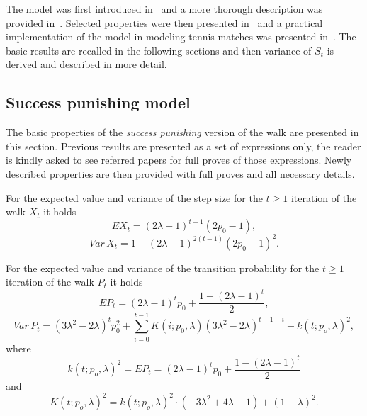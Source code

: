 \documentclass[runningheads]{CMSIM}
\begin{document}
    The model was first introduced in~\cite{ja2017ddny} and a more thorough
    description was provided in~\cite{ja2019teze}.
    Selected properties
    were then presented in~\cite{ja2019apmat} and a practical implementation
    of the model in modeling tennis matches was presented in~\cite{ja2019mathsport_proc}.
    The basic results are recalled in the following sections and then
    variance of $S_{t}$ is derived and described in more detail.

    \subsection{Success punishing model}\label{subsec:success-punishing-model}

    The basic properties of the \emph{success punishing }version of the
    walk are presented in this section.
    Previous results are presented
    as a set of expressions only, the reader is kindly asked to see referred
    papers for full proves of those expressions.
    Newly described properties
    are then provided with full proves and all necessary details.

    For the expected value and variance of the step size for the $t\ge1$
    iteration of the walk $X_{t}$ it holds~\cite{ja2019apmat}
    \begin{equation}
        EX_{t}=(2\lambda-1)^{t-1}(2p_{0}-1),\label{eq:e_x_t_sp}
    \end{equation}
    \begin{equation}
        Var\,X_{t}=1-(2\lambda-1)^{2(t-1)}(2p_{0}-1)^{2}.\label{eq:var_x_t_sp}
    \end{equation}

    For the expected value and variance of the transition probability
    for the $t\ge1$ iteration of the walk $P_{t}$ it holds~\cite{ja2017ddny,ja2019apmat}
    \begin{equation}
        EP_{t}=(2\lambda-1)^{t}p_{0}+\frac{1-(2\lambda-1)^{t}}{2},\label{eq:e_p_t_sp}
    \end{equation}
    \begin{equation}
        Var\,P_{t}=(3\lambda^{2}-2\lambda)^{t}p_{0}^{2}+\sum_{i=0}^{t-1}K(i;p_{0},\lambda)(3\lambda^{2}-2\lambda)^{t-1-i}-k(t;p_{o},\lambda)^{2},\label{eq:var_p_t_sp}
    \end{equation}
    where
    \[
        k(t;p_{o},\lambda)^{2}=EP_{t}=(2\lambda-1)^{t}p_{0}+\frac{1-(2\lambda-1)^{t}}{2}
    \]
    and
    \[
        K(t;p_{o},\lambda)^{2}=k(t;p_{o},\lambda)^{2}\cdot(-3\lambda^{2}+4\lambda-1)+(1-\lambda)^{2}.
    \]
\end{document}
